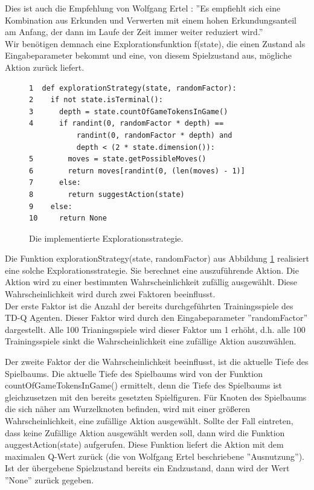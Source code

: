 Dies ist auch die Empfehlung von Wolfgang Ertel \cite[303]{Ertel}: ''Es empfiehlt sich eine Kombination aus Erkunden und Verwerten mit einem hohen Erkundungsanteil am Anfang, der dann im Laufe der Zeit immer weiter reduziert wird.'' \\

Wir benötigen demnach eine Explorationsfunktion f(state), die einen Zustand als Eingabeparameter bekommt und eine, von diesem Spielzustand aus, mögliche Aktion zurück liefert.\\

\begin{figure}[!htbp]
\centering
\begin{lstlisting}[frame=single, mathescape=true]
1  def explorationStrategy(state, randomFactor):
2    if not state.isTerminal():
3      depth = state.countOfGameTokensInGame()
4      if randint(0, randomFactor * depth) == 
           randint(0, randomFactor * depth) and
           depth < (2 * state.dimension()):
5        moves = state.getPossibleMoves()
6        return moves[randint(0, (len(moves) - 1)]
7      else:
8        return suggestAction(state)
9    else:
10     return None
\end{lstlisting}
\caption{Die implementierte Explorationsstrategie.}
\label{fig:Explorationsstrategie}
\end{figure} 

Die Funktion explorationStrategy(state, randomFactor) aus Abbildung \ref{fig:Explorationsstrategie} realisiert eine solche Explorationsstrategie. Sie berechnet eine auszuführende Aktion. Die Aktion wird zu einer bestimmten Wahrscheinlichkeit zufällig ausgewählt. Diese Wahrscheinlichkeit wird durch zwei Faktoren beeinflusst.\\

Der erste Faktor ist die Anzahl der bereits durchgeführten Trainingsspiele des TD-Q Agenten. Dieser Faktor wird durch den Eingabeparameter ''randomFactor'' dargestellt. Alle 100 Trianingsspiele wird dieser Faktor um 1 erhöht, d.h. alle 100 Trainingsspiele sinkt die Wahrscheinlichkeit eine zufällige  Aktion auszuwählen. \\
\newpage


Der zweite Faktor der die Wahrscheinlichkeit beeinflusst, ist die aktuelle Tiefe des Spielbaums. Die aktuelle Tiefe des Spielbaums wird von der Funktion countOfGameTokensInGame() ermittelt, denn die Tiefe des Spielbaums ist gleichzusetzen mit den bereits gesetzten Spielfiguren. Für Knoten des Spielbaums die sich näher am Wurzelknoten befinden, wird mit einer größeren Wahrscheinlichkeit, eine zufällige Aktion ausgewählt. Sollte der Fall eintreten, dass keine Zufällige Aktion ausgewählt werden soll, dann wird die Funktion auggestAction(state) aufgerufen. Diese Funktion liefert die Aktion mit dem maximalen Q-Wert zurück (die von Wolfgang Ertel beschriebene ''Ausnutzung''). Ist der übergebene Spielzustand bereits ein Endzustand, dann wird der Wert ''None'' zurück gegeben.

